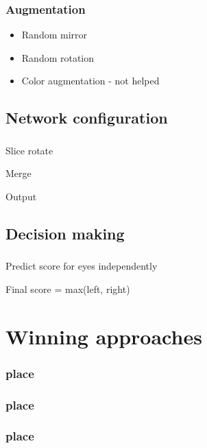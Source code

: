 \documentclass{beamer}
\begin{document}
\begin{frame}\frametitle{Augmentation}
\begin{itemize}
\item Random mirror
\item Random rotation
\item Color augmentation - not helped
\end{itemize}

\end{frame}

\subsection{Network configuration}
\begin{frame}\frametitle{}
\par Slice rotate
\par Merge
\par Output
\end{frame}

\subsection{Decision making}

\begin{frame}\frametitle{}
\par Predict score for eyes independently
\par Final score = max(left, right)
\end{frame}

\section{Winning approaches} 
\begin{frame}\frametitle{ place}
\end{frame}
\begin{frame}\frametitle{ place}
\end{frame}
\begin{frame}\frametitle{ place}
\end{frame}
\end{document}
